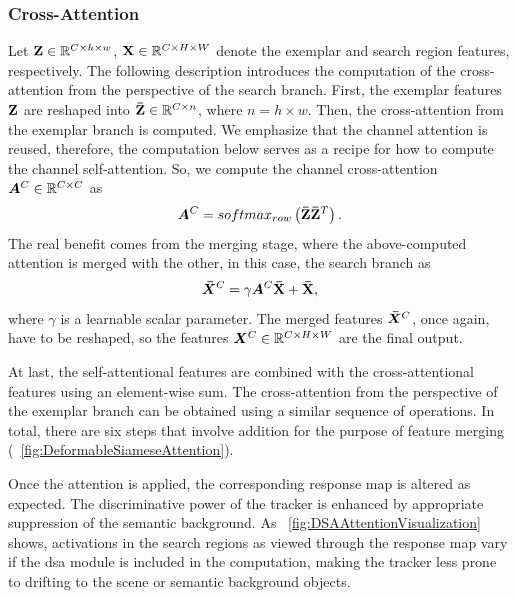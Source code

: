 \subsubsection{Cross-Attention}

Let $\mathbf{Z} \in \mathbb{R}^{{C} \times {h} \times {w}}$, $\mathbf{X} \in \mathbb{R}^{{C} \times {H} \times {W}}$ denote the exemplar and search region features, respectively. The following description introduces the computation of the cross-attention from the perspective of the search branch. First, the exemplar features $\mathbf{Z}$ are reshaped into $\mathbf{\bar{Z}} \in \mathbb{R}^{{C} \times {n}}$, where $n = h \times w$. Then, the cross-attention from the exemplar branch is computed. We emphasize that the channel attention is reused, therefore, the computation below serves as a recipe for how to compute the channel self-attention. So, we compute the channel cross-attention $\bm{A}^{C} \in \mathbb{R}^{{C} \times {C}}$ as
\begin{equation}
    \label{eq:CrossAttentionCalc}
    \bm{A}^{C} =
    {softmax_{row}} \left( \mathbf{\bar{Z}} \mathbf{\bar{Z}}^T \right).
\end{equation}
The real benefit comes from the merging stage, where the above-computed attention is merged with the other, in this case, the search branch as
\begin{equation}
    \label{eq:CrossAttentionMerge}
    \bm{\bar{X}}^{C} =
    \gamma \bm{A}^{C} \mathbf{\bar{X}} + \mathbf{\bar{X}},
\end{equation}
where $\gamma$ is a learnable scalar parameter. The merged features $\bm{\bar{X}}^{C}$, once again, have to be reshaped, so the features $\bm{X}^{C} \in \mathbb{R}^{{C} \times {H} \times {W}}$ are the final output.

At last, the self-attentional features are combined with the cross-attentional features using an element-wise sum. The cross-attention from the perspective of the exemplar branch can be obtained using a similar sequence of operations. In total, there are six steps that involve addition for the purpose of feature merging (\figtext{}~\ref{fig:DeformableSiameseAttention}).

Once the attention is applied, the corresponding response map is altered as expected. The discriminative power of the tracker is enhanced by appropriate suppression of the semantic background. As \figtext{}~\ref{fig:DSAAttentionVisualization} shows, activations in the search regions as viewed through the response map vary if the \gls{dsa} module is included in the computation, making the tracker less prone to drifting to the scene or semantic background objects.

